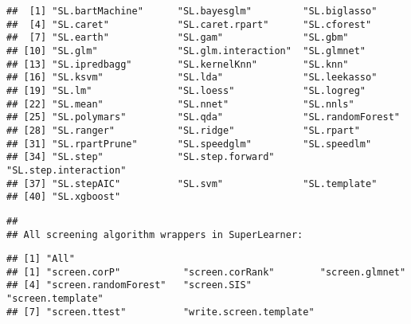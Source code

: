 \documentclass[
]{article}
\begin{document}
\begin{verbatim}
##  [1] "SL.bartMachine"      "SL.bayesglm"         "SL.biglasso"        
##  [4] "SL.caret"            "SL.caret.rpart"      "SL.cforest"         
##  [7] "SL.earth"            "SL.gam"              "SL.gbm"             
## [10] "SL.glm"              "SL.glm.interaction"  "SL.glmnet"          
## [13] "SL.ipredbagg"        "SL.kernelKnn"        "SL.knn"             
## [16] "SL.ksvm"             "SL.lda"              "SL.leekasso"        
## [19] "SL.lm"               "SL.loess"            "SL.logreg"          
## [22] "SL.mean"             "SL.nnet"             "SL.nnls"            
## [25] "SL.polymars"         "SL.qda"              "SL.randomForest"    
## [28] "SL.ranger"           "SL.ridge"            "SL.rpart"           
## [31] "SL.rpartPrune"       "SL.speedglm"         "SL.speedlm"         
## [34] "SL.step"             "SL.step.forward"     "SL.step.interaction"
## [37] "SL.stepAIC"          "SL.svm"              "SL.template"        
## [40] "SL.xgboost"
\end{verbatim}

\begin{verbatim}
## 
## All screening algorithm wrappers in SuperLearner:
\end{verbatim}

\begin{verbatim}
## [1] "All"
## [1] "screen.corP"           "screen.corRank"        "screen.glmnet"        
## [4] "screen.randomForest"   "screen.SIS"            "screen.template"      
## [7] "screen.ttest"          "write.screen.template"
\end{verbatim}
\end{document}
